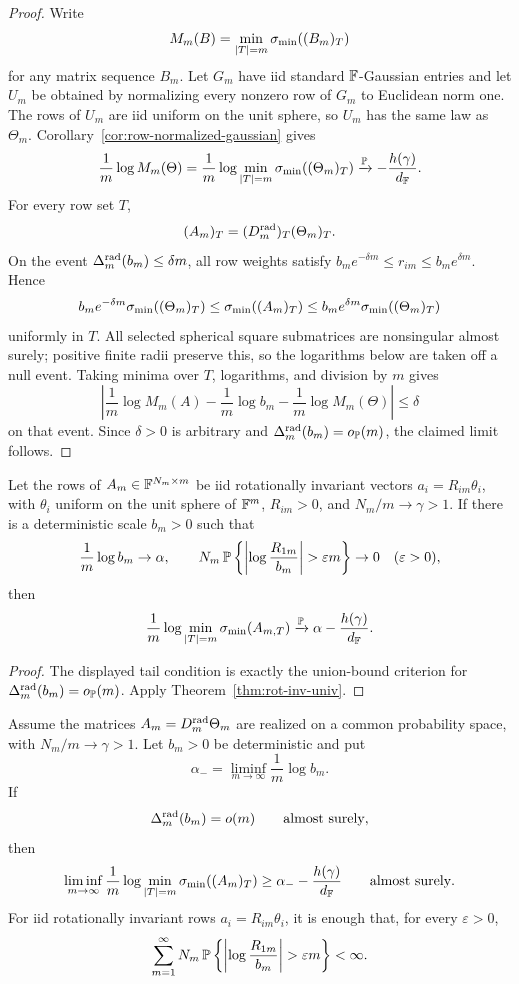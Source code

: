 \begin{proof}
Write
\[
  M_m(B)=\min_{|T|=m}\sigma_{\min}((B_m)_T)
\]
for any matrix sequence \(B_m\).
Let \(G_m\) have iid standard \(\mathbb{F}\)-Gaussian entries and let \(U_m\) be obtained
by normalizing every nonzero row of \(G_m\) to Euclidean norm one.  The rows of
\(U_m\) are iid uniform on the unit sphere, so \(U_m\) has the same law as
\(\Theta_m\).  Corollary~\ref{cor:row-normalized-gaussian} gives
\[
  \frac1m\log M_m(\Theta)
  =
  \frac1m\log\min_{|T|=m}\sigma_{\min}((\Theta_m)_T)
  \xrightarrow{\mathbb{P}}-\frac{h(\gamma)}{d_{\mathbb{F}}}.
\]
For every row set \(T\),
\[
  (A_m)_T=(D_m^{\rm rad})_T(\Theta_m)_T .
\]
On the event \(\Delta_m^{\rm rad}(b_m)\le\delta m\), all row weights satisfy
\(b_me^{-\delta m}\le r_{im}\le b_me^{\delta m}\).  Hence
\[
  b_me^{-\delta m}\sigma_{\min}((\Theta_m)_T)
  \le \sigma_{\min}((A_m)_T)
  \le b_me^{\delta m}\sigma_{\min}((\Theta_m)_T)
\]
uniformly in \(T\).  All selected spherical square submatrices are nonsingular
almost surely; positive finite radii preserve this, so the logarithms below are
taken off a null event.  Taking minima over \(T\), logarithms, and division by
\(m\) gives
\[
  \left|
  \frac1m\log M_m(A)-\frac1m\log b_m-\frac1m\log M_m(\Theta)
  \right|
  \le \delta
\]
on that event.  Since \(\delta>0\) is arbitrary and
\(\Delta_m^{\rm rad}(b_m)=o_{\mathbb{P}}(m)\), the claimed limit follows.
\end{proof}

\begin{corollary}\label{cor:rot-controlled-radii}
Let the rows of \(A_m\in\mathbb{F}^{N_m\times m}\) be iid rotationally invariant vectors
\(a_i=R_{im}\theta_i\), with \(\theta_i\) uniform on the unit sphere of
\(\mathbb{F}^m\), \(R_{im}>0\), and \(N_m/m\to\gamma>1\).  If there is a deterministic
scale \(b_m>0\) such that
\[
  \frac{1}{m}\log b_m\to\alpha,
  \qquad
  N_m\,\PP\left\{
    \left|\log\frac{R_{1m}}{b_m}\right|>\varepsilon m
  \right\}\to0
  \quad(\varepsilon>0),
\]
then
\[
  \frac1m\log\min_{|T|=m}\sigma_{\min}(A_{m,T})
  \xrightarrow{\mathbb{P}}
  \alpha-\frac{h(\gamma)}{d_{\mathbb{F}}}.
\]
\end{corollary}

\begin{proof}
The displayed tail condition is exactly the union-bound criterion for
\(\Delta_m^{\rm rad}(b_m)=o_{\mathbb{P}}(m)\).  Apply
Theorem~\ref{thm:rot-inv-univ}.
\end{proof}

\begin{corollary}\label{cor:rot-inv-as-lower-envelope}
Assume the matrices \(A_m=D_m^{\rm rad}\Theta_m\) are realized on a common
probability space, with \(N_m/m\to\gamma>1\).  Let \(b_m>0\) be deterministic and
put
\[
  \alpha_-=\liminf_{m\to\infty}\frac1m\log b_m.
\]
If
\[
  \Delta_m^{\rm rad}(b_m)=o(m)\qquad\hbox{almost surely},
\]
then
\[
  \liminf_{m\to\infty}\frac1m
  \log\min_{|T|=m}\sigma_{\min}((A_m)_T)
  \ge \alpha_- -\frac{h(\gamma)}{d_{\mathbb{F}}}
  \qquad\hbox{almost surely}.
\]
For iid rotationally invariant rows \(a_i=R_{im}\theta_i\), it is enough that,
for every \(\varepsilon>0\),
\[
  \sum_{m=1}^\infty
  N_m\,\PP\left\{
    \left|\log\frac{R_{1m}}{b_m}\right|>\varepsilon m
  \right\}<\infty .
\]
\end{corollary}

